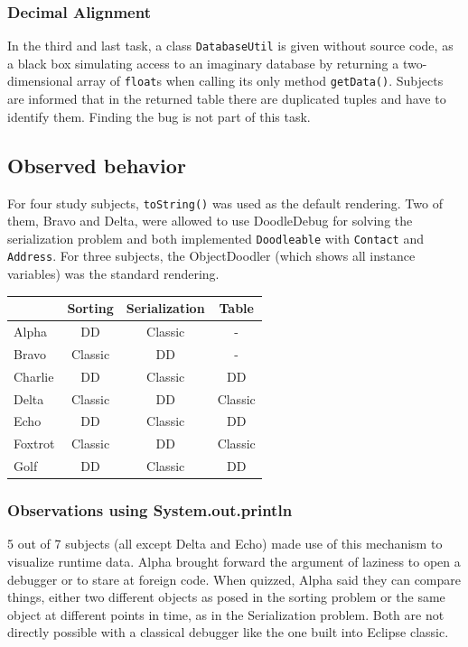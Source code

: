 \documentclass[english]{scrartcl}
\newcommand{\DD}{Dood\-le\-De\-bug\xspace}
\begin{document}
\subsubsection{Decimal Alignment}
In the third and last task, a class \texttt{DatabaseUtil} is given without source code, as a black box simulating access to an imaginary database by returning a two-dimensional array of \texttt{float}s when calling its only method \texttt{getData()}.
Subjects are informed that in the returned table there are duplicated tuples and have to identify them.
Finding the bug is not part of this task.

\subsection{Observed behavior}
For four study subjects, \texttt{toString()} was used as the default rendering.
Two of them, Bravo and Delta, were allowed to use \DD for solving the serialization problem and both implemented \texttt{Doodleable} with \texttt{Contact} and \texttt{Address}.
For three subjects, the ObjectDoodler (which shows all instance variables) was the standard rendering.

\begin{tabular}{l | c c c}
\label{tool-usage-table}
 & \textbf{Sorting} & \textbf{Serialization} & \textbf{Table} \\
\hline
Alpha & DD & Classic & - \\
Bravo & Classic & DD & - \\
Charlie & DD & Classic & DD \\
Delta & Classic & DD & Classic \\
Echo & DD & Classic & DD \\
Foxtrot & Classic & DD & Classic \\
Golf & DD & Classic & DD \\
\end{tabular}

\subsubsection{Observations using System.out.println}
5 out of 7 subjects (all except Delta and Echo) made use of this mechanism to visualize runtime data.
Alpha brought forward the argument of laziness to open a debugger or to stare at foreign code.
When quizzed, Alpha said they can compare things, either two different objects as posed in the sorting problem or the same object at different points in time, as in the Serialization problem.
Both are not directly possible with a classical debugger like the one built into Eclipse classic.
\end{document}

